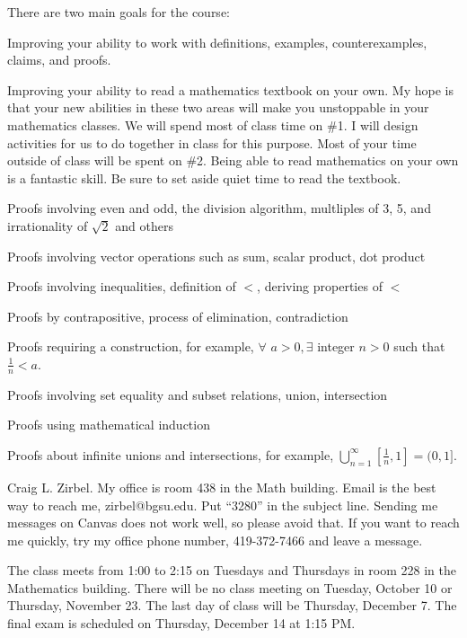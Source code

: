 \vspace*{-0.2in}

There are two main goals for the course:
\blist{0.0in}
\item Improving your ability to work with definitions, examples, counterexamples, claims, and proofs.
\item Improving your ability to read a mathematics textbook on your own.
\elist
My hope is that your new abilities in these two areas will make you unstoppable in your mathematics classes.
We will spend most of class time on \#1.  
I will design activities for us to do together in class for this purpose.
Most of your time outside of class will be spent on \#2.
Being able to read mathematics on your own is a fantastic skill.
Be sure to set aside quiet time to read the textbook.

\balist{0.0in}
\item Proofs involving even and odd, the division algorithm, multliples of 3, 5, and irrationality of $\sqrt{2}$ and others
\item Proofs involving vector operations such as sum, scalar product, dot product
\item Proofs involving inequalities, definition of $<$, deriving properties of $<$
\item Proofs by contrapositive, process of elimination, contradiction
\item Proofs requiring a construction, for example, $\forall$ $a > 0, \exists$ integer $n > 0$ such that $\frac{1}{n} < a$.
\item Proofs involving set equality and subset relations, union, intersection
\item Proofs using mathematical induction
\item Proofs about infinite unions and intersections, for example, $\bigcup_{n=1}^{\infty} [\frac{1}{n}, 1] = (0,1]$.
\ealist

Craig L. Zirbel.
My office is room 438 in the Math building.
Email is the best way to reach me, zirbel@bgsu.edu.
Put ``3280'' in the subject line.
Sending me messages on Canvas does not work well, so please avoid that.
If you want to reach me quickly, try my office phone number, 419-372-7466 and leave a message.

The class meets from 1:00 to 2:15 on Tuesdays and Thursdays in room 228 in the Mathematics building.
There will be no class meeting on Tuesday, October 10 or Thursday, November 23.
The last day of class will be Thursday, December 7.
The final exam is scheduled on Thursday, December 14 at 1:15 PM.

